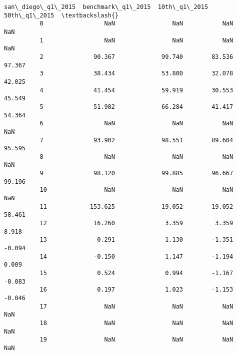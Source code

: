 \documentclass[11pt]{article}
\begin{document}
\begin{Verbatim}[commandchars=\\\{\}]
              san\_diego\_q1\_2015  benchmark\_q1\_2015  10th\_q1\_2015  50th\_q1\_2015  \textbackslash{}
          0                 NaN                NaN           NaN           NaN   
          1                 NaN                NaN           NaN           NaN   
          2              90.367             99.740        83.536        97.367   
          3              38.434             53.800        32.078        42.025   
          4              41.454             59.919        30.553        45.549   
          5              51.982             66.284        41.417        54.364   
          6                 NaN                NaN           NaN           NaN   
          7              93.902             98.551        89.604        95.595   
          8                 NaN                NaN           NaN           NaN   
          9              98.120             99.885        96.667        99.196   
          10                NaN                NaN           NaN           NaN   
          11            153.625             19.052        19.052        58.461   
          12             16.260              3.359         3.359         8.918   
          13              0.291              1.130        -1.351        -0.094   
          14             -0.150              1.147        -1.194         0.009   
          15              0.524              0.994        -1.167        -0.083   
          16              0.197              1.023        -1.153        -0.046   
          17                NaN                NaN           NaN           NaN   
          18                NaN                NaN           NaN           NaN   
          19                NaN                NaN           NaN           NaN   
          

\end{Verbatim}
\end{document}
